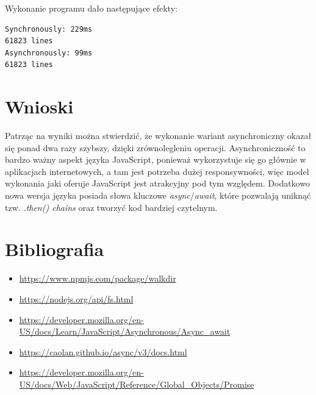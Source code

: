 \documentclass[12pt]{article}
\begin{document}
\noindent
Wykonanie programu dało następujące efekty:
\begin{verbatim}
Synchronously: 229ms
61823 lines
Asynchronously: 99ms
61823 lines
\end{verbatim}

\section{Wnioski}
Patrząc na wyniki można stwierdzić, że wykonanie wariant asynchroniczny okazał się ponad dwa razy szybszy, dzięki zrównolegleniu operacji. Asynchroniczność to bardzo ważny aspekt języka JavaScript, ponieważ wykorzystuje się go głównie w aplikacjach internetowych, a tam jest potrzeba dużej responsywności, więc model wykonania jaki oferuje JavaScript jest atrakcyjny pod tym względem. Dodatkowo nowa wersja języka posiada słowa kluczowe \emph{async}/\emph{await}, które pozwalają uniknąć tzw. \emph{.then() chains} oraz tworzyć kod bardziej czytelnym.


\newpage
\section{Bibliografia}
\begin{itemize}
    \item \url{https://www.npmjs.com/package/walkdir}
    \item \url{https://nodejs.org/api/fs.html}
    \item \url{https://developer.mozilla.org/en-US/docs/Learn/JavaScript/Asynchronous/Async_await}
    \item \url{https://caolan.github.io/async/v3/docs.html}
    \item \url{https://developer.mozilla.org/en-US/docs/Web/JavaScript/Reference/Global_Objects/Promise}


\end{itemize}
\end{document}
